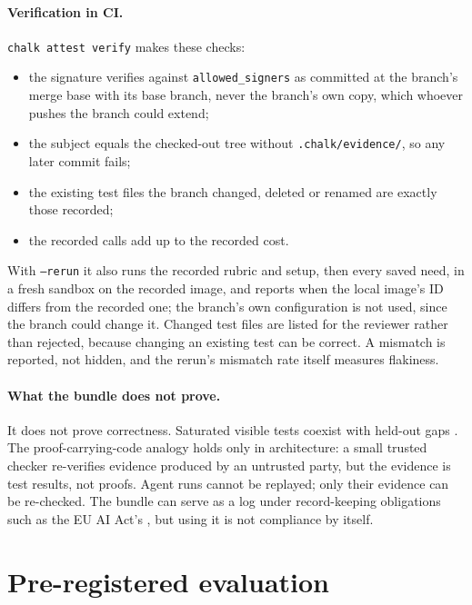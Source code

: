 \documentclass[11pt]{article}
\theoremstyle{remark}
\begin{document}
\paragraph{Verification in CI.}
\texttt{chalk attest verify} makes these checks:
\begin{itemize}[leftmargin=*,nosep]
\item the signature verifies against \texttt{allowed\_signers} as committed at the branch's merge base with its base branch, never the branch's own copy, which whoever pushes the branch could extend;
\item the subject equals the checked-out tree without \texttt{.chalk/evidence/}, so any later commit fails;
\item the existing test files the branch changed, deleted or renamed are exactly those recorded;
\item the recorded calls add up to the recorded cost.
\end{itemize}
With \texttt{--rerun} it also runs the recorded rubric and setup, then every saved need, in a fresh sandbox on the recorded image, and reports when the local image's ID differs from the recorded one; the branch's own configuration is not used, since the branch could change it. Changed test files are listed for the reviewer rather than rejected, because changing an existing test can be correct. A mismatch is reported, not hidden, and the rerun's mismatch rate itself measures flakiness.

\paragraph{What the bundle does not prove.}
It does not prove correctness. Saturated visible tests coexist with held-out gaps \citep{specbench2026}. The proof-carrying-code analogy \citep{necula1997pcc} holds only in architecture: a small trusted checker re-verifies evidence produced by an untrusted party, but the evidence is test results, not proofs. Agent runs cannot be replayed; only their evidence can be re-checked. The bundle can serve as a log under record-keeping obligations such as the EU AI Act's \citep{euaiact}, but using it is not compliance by itself.

\section{Pre-registered evaluation}
\label{sec:eval}
\end{document}
